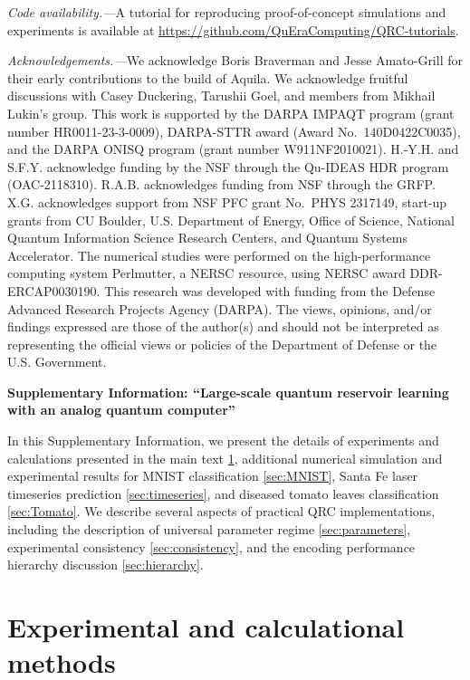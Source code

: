 \documentclass[english,floatfix,twocolumn,showpacs, aps, prx, reprint, superscriptaddress, longbibliography]{revtex4-2}
\begin{document}


\textit{Code  availability.---}A tutorial for reproducing proof-of-concept simulations and experiments is available at \url{https://github.com/QuEraComputing/QRC-tutorials}.

\textit{Acknowledgements.---}We acknowledge Boris Braverman and Jesse Amato-Grill for their early contributions to the build of Aquila. We acknowledge fruitful discussions with Casey Duckering, Tarushii Goel, and members from Mikhail Lukin's group. This work is supported by the DARPA IMPAQT program (grant number HR0011-23-3-0009), DARPA-STTR award (Award No.~140D0422C0035), and the DARPA ONISQ program (grant number W911NF2010021). H.-Y.H. and S.F.Y. acknowledge funding by the NSF through the Qu-IDEAS HDR program (OAC-2118310). R.A.B. acknowledges funding from NSF through the GRFP. X.G. acknowledges support from NSF PFC grant No.~PHYS 2317149, start-up grants from CU Boulder, U.S. Department of Energy, Office of Science, National Quantum Information Science Research Centers, and Quantum Systems Accelerator. The numerical studies were performed on the high-performance computing system Perlmutter, a NERSC resource, using NERSC award DDR-ERCAP0030190. This research was developed with funding from the Defense Advanced Research Projects Agency (DARPA). The views, opinions, and/or findings expressed are those of the author(s) and should not be interpreted as representing the official views or policies of the Department of Defense or the U.S. Government. 

%


\clearpage
\onecolumngrid
\begin{center}
{\bf Supplementary Information: ``Large-scale quantum reservoir learning with an analog quantum computer''}
\end{center}
In this Supplementary Information, we present the details of experiments and calculations presented in the main text \ref{sec:calcdetails}, additional numerical simulation and experimental results for MNIST classification \ref{sec:MNIST},  Santa Fe laser timeseries prediction \ref{sec:timeseries}, and diseased tomato leaves classification \ref{sec:Tomato}. We describe several aspects of practical QRC implementations, including the description of universal parameter regime \ref{sec:parameters}, experimental consistency \ref{sec:consistency}, and the encoding performance hierarchy discussion \ref{sec:hierarchy}.

\section{Experimental and calculational methods}
\label{sec:calcdetails}
\end{document}
